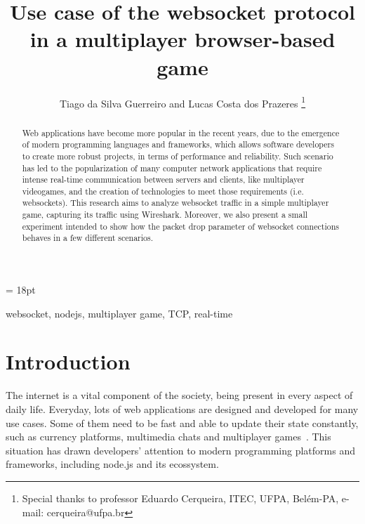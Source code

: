 \documentclass[english]{sbrt}
\begin{document}
\title{Use case of the websocket protocol in a multiplayer browser-based game}

\author{Tiago da Silva Guerreiro and Lucas Costa dos Prazeres
  \thanks{Special thanks to professor Eduardo Cerqueira, ITEC, UFPA, Belém-PA, e-mail: cerqueira@ufpa.br}
}

\maketitle

\baselineskip = 18pt


\begin{abstract}
  Web applications have become more popular in the recent years, due to the emergence of modern programming languages and frameworks, which allows software developers to create more robust projects, in terms of performance and reliability.
  Such scenario has led to the popularization of many computer network applications that require intense real-time communication between servers and clients, like multiplayer videogames, and the creation of technologies to meet those requirements (i.e. websockets).
  This research aims to analyze websocket traffic in a simple multiplayer game, capturing its traffic using Wireshark.
  Moreover, we also present a small experiment intended to show how the packet drop parameter of websocket connections behaves in a few different scenarios.

\end{abstract}
\begin{keywords}
  websocket, nodejs, multiplayer game, TCP, real-time
\end{keywords}

\section{\textbf{Introduction}}

The internet is a vital component of the society, being present in every aspect of daily life.
Everyday, lots of web applications are designed and developed for
many use cases. Some of them need to be fast and able to update their state constantly, such as currency platforms, multimedia chats and multiplayer games~\cite{chen2011framework}\cite{kawase2015development}.
This situation has drawn developers' attention to modern programming platforms and frameworks, including node.js and its ecossystem.
\end{document}
